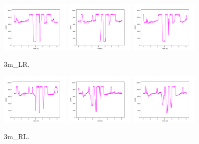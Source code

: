 \begin{figure}[!ht]
\begin{center}
\includegraphics[width=0.3\textwidth]{../data/3m_LR/3m_LR_1.png}
\includegraphics[width=0.3\textwidth]{../data/3m_LR/3m_LR_2.png}
\includegraphics[width=0.3\textwidth]{../data/3m_LR/3m_LR_3.png}
\caption{3m\_LR.\label{fig:3m_LR}}
\end{center}
\end{figure}

\begin{figure}[!ht]
\begin{center}
\includegraphics[width=0.3\textwidth]{../data/3m_RL2/3m_RL2_1.png}
\includegraphics[width=0.3\textwidth]{../data/3m_RL2/3m_RL2_2.png}
\includegraphics[width=0.3\textwidth]{../data/3m_RL2/3m_RL2_3.png}
\caption{3m\_RL.\label{fig:3m_RL}}
\end{center}
\end{figure}

